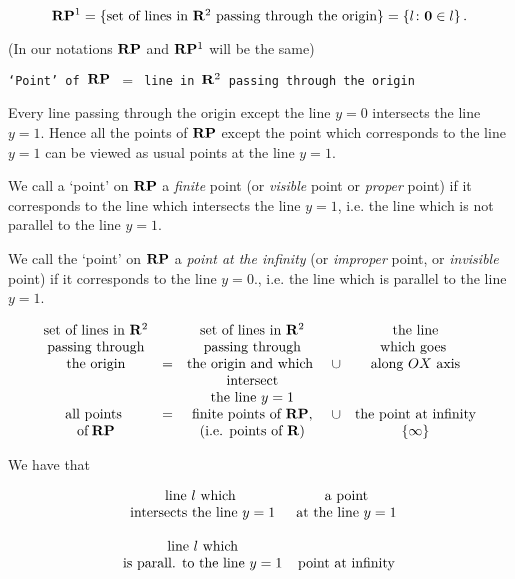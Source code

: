 \documentclass[12pt]{article}
\numberwithin{equation}{section}
\begin{document}
\def\P {{\bf P}}

    \begin{equation*}
 \R\P^1=\{\hbox {set of lines in $\R^2$ passing through the origin}\}=
\{l\colon {\bf 0}\in l\}\,.
     \end{equation*} 

(In our notations $\R\P$ and $\R\P^1$ will be the same)

 \m


{\tt `Point'  of $\R\P$  $=$ line in ${\bf R}^2$ passing through the 
origin} 

\m

Every line passing through the origin except the
line $y=0$ intersects the line $y=1$.
Hence all the points of $\R\P$ except the
point which corresponds  to  the line $y=1$
 can be viewed as usual  points at the line $y=1$. 

We call a `point' on $\R\P$ a {\it finite } point (or {\it visible}
point  or {\it proper} point) if it corresponds to the line which 
intersects the line $y=1$,
i.e. the line which is not parallel to the line $y=1$.

We call the `point' on $\R\P$ a {\it point at the infinity}
(or {\it improper} point, or {\it invisible} point)
if it corresponds to the line $y=0$., i.e. the
line which is parallel to the line $y=1$.
 
    \begin{equation*}
     \begin{matrix}
    \hbox {set of lines in $\R^2$}     & & \hbox {set of lines in $\R^2$} 
               & & \hbox {the line}\cr
    \hbox {passing through}     & & \hbox {passing through} 
               & & \hbox {which goes }\cr
    \hbox {the origin}     &= & \hbox {the origin and which } 
               &\cup & \hbox {along $OX$ axis}\cr
    \hbox {}     & & \hbox {intersect} 
               & & \hbox {}\cr
    \hbox {}     & & \hbox {the line $y=1$} 
               & & \hbox {}\cr
    \hbox{all points }     &= & \hbox{finite points of $\R\P$,} 
             &\cup & \hbox{the point at infinity}\cr
     {\rm of}\,\R\P   & {}  &\hbox {(i.e. points of $\R$)} & {} & \{\infty\}\cr  
     \end{matrix}
    \end{equation*}

   \bigskip

We have that

  \begin{equation*}
   \begin{matrix} 
     \hbox {line $l$ which }  & \hbox{a  point}\cr
     \hbox {intersects the line $y=1$}  & 
               \hbox{at the line $y=1$}\cr
           &  \cr
     \hbox {line $l$ which}  & 
               \hbox{}\cr
     \hbox {is parall. to the  line $y=1$}  & 
               \hbox{point at infinity}\cr
   \end{matrix}
     \end{equation*} 
\end{document}
